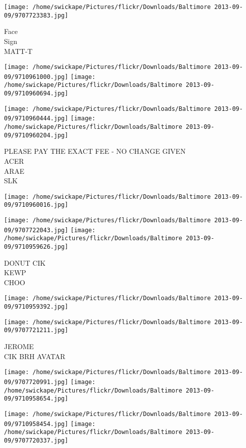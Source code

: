 \documentclass[10pt,letterpaper]{article}
\begin{document}
\vspace{0.25in}
\texttt{[image: /home/swickape/Pictures/flickr/Downloads/Baltimore 2013-09-09/9707723383.jpg]}

Face\\
Sign\\
MATT{-}T
\pagebreak

\texttt{[image: /home/swickape/Pictures/flickr/Downloads/Baltimore 2013-09-09/9710961000.jpg]}
\texttt{[image: /home/swickape/Pictures/flickr/Downloads/Baltimore 2013-09-09/9710960694.jpg]}

\texttt{[image: /home/swickape/Pictures/flickr/Downloads/Baltimore 2013-09-09/9710960444.jpg]}
\texttt{[image: /home/swickape/Pictures/flickr/Downloads/Baltimore 2013-09-09/9710960204.jpg]}

PLEASE PAY THE EXACT FEE {-} NO CHANGE GIVEN\\
ACER\\
ARAE\\
SLK
\pagebreak

\texttt{[image: /home/swickape/Pictures/flickr/Downloads/Baltimore 2013-09-09/9710960016.jpg]}

\vspace{0.25in}
\texttt{[image: /home/swickape/Pictures/flickr/Downloads/Baltimore 2013-09-09/9707722043.jpg]}
\texttt{[image: /home/swickape/Pictures/flickr/Downloads/Baltimore 2013-09-09/9710959626.jpg]}

DONUT CIK\\
KEWP\\
CHOO
\pagebreak

\texttt{[image: /home/swickape/Pictures/flickr/Downloads/Baltimore 2013-09-09/9710959392.jpg]}

\vspace{0.25in}
\texttt{[image: /home/swickape/Pictures/flickr/Downloads/Baltimore 2013-09-09/9707721211.jpg]}

JEROME\\
CIK BRH AVATAR
\pagebreak

\texttt{[image: /home/swickape/Pictures/flickr/Downloads/Baltimore 2013-09-09/9707720991.jpg]}
\texttt{[image: /home/swickape/Pictures/flickr/Downloads/Baltimore 2013-09-09/9710958654.jpg]}

\texttt{[image: /home/swickape/Pictures/flickr/Downloads/Baltimore 2013-09-09/9710958454.jpg]}
\texttt{[image: /home/swickape/Pictures/flickr/Downloads/Baltimore 2013-09-09/9707720337.jpg]}
\end{document}
